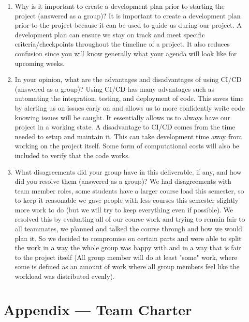 \documentclass{article}
\begin{document}
\begin{enumerate}
    \item Why is it important to create a development plan prior to starting the
    project (answered as a group)?
        It is important to create a development plan prior to the project 
    because it can be used to guide us during our project. A development plan can ensure
    we stay on track and meet specific criteria/checkpoints throughout the timeline 
    of a project. It also reduces confusion since you will know generally what your agenda 
    will look like for upcoming weeks. 
    \item In your opinion, what are the advantages and disadvantages of using
    CI/CD (answered as a group)?
    Using CI/CD has many advantages such as automating the integration, testing, and deployment 
    of code. This saves time by alerting us on issues early on and allows us to more confidently 
    write code knowing issues will be caught. It essentially allows us to always have our project 
    in a working state. A disadvantage to CI/CD comes from the time needed to setup and maintain it. 
    This can take development time away from working on the project itself. Some form of computational 
    costs will also be included to verify that the code works. 
    \item What disagreements did your group have in this deliverable, if any,
    and how did you resolve them (answered as a group)?
    We had disagreements with team member roles, some students have a larger
    course load this semester, so to keep it reasonable we gave people with less courses this 
    semester slightly more work to do (but we will try to keep everything even if possible). We resolved 
    this by evaluating all of our course work and trying to remain fair to all teammates, we planned and talked 
    the course through and how we would plan it. So we decided to compromise on certain parts and were able to split
    the work in a way the whole group was happy with and in a way that is fair to the project itself (All group member will do at least "some" work, where some is defined as an amount of work where all group members feel like the workload was distributed evenly).
\end{enumerate}

\newpage{}

\section*{Appendix --- Team Charter}
\end{document}
